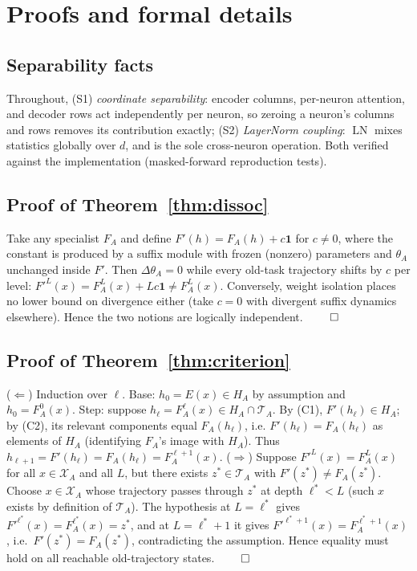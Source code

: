 \documentclass[11pt]{article}
\theoremstyle{definition}\newtheorem{definition}{Definition}
\theoremstyle{remark}\newtheorem{remark}{Remark}
\newcommand{\Xa}{\mathcal{X}_A}
\newcommand{\TA}{\mathcal{T}_A}
\begin{document}
\appendix

\section{Proofs and formal details}\label{app:proofs}

\subsection{Separability facts}
Throughout, (S1) \emph{coordinate separability}: encoder columns, per-neuron attention, and
decoder rows act independently per neuron, so zeroing a neuron's columns and rows removes
its contribution exactly; (S2) \emph{LayerNorm coupling}: $\operatorname{LN}$ mixes
statistics globally over $d$, and is the sole cross-neuron operation. Both verified against
the implementation (masked-forward reproduction tests).

\subsection{Proof of Theorem~\ref{thm:dissoc}}
Take any specialist $F_A$ and define $F'(h)=F_A(h)+c\mathbf{1}$ for $c\neq0$, where the
constant is produced by a suffix module with frozen (nonzero) parameters and $\theta_A$
unchanged inside $F'$. Then $\Delta\theta_A=0$ while every old-task trajectory shifts by
$c$ per level: $F'^L(x)=F_A^L(x)+Lc\mathbf{1}\neq F_A^L(x)$. Conversely, weight isolation
places no lower bound on divergence either (take $c=0$ with divergent suffix dynamics
elsewhere). Hence the two notions are logically independent. \hfill$\qed$

\subsection{Proof of Theorem~\ref{thm:criterion}}
($\Leftarrow$) Induction over $\ell$. Base: $h_0=E(x)\in H_A$ by assumption and
$h_0=F_A^0(x)$. Step: suppose $h_\ell=F_A^\ell(x)\in H_A\cap\TA$. By (C1),
$F'(h_\ell)\in H_A$; by (C2), its relevant components equal $F_A(h_\ell)$, i.e.
$F'(h_\ell)=F_A(h_\ell)$ as elements of $H_A$ (identifying $F_A$'s image with $H_A$).
Thus $h_{\ell+1}=F'(h_\ell)=F_A(h_\ell)=F_A^{\ell+1}(x)$.
($\Rightarrow$) Suppose $F'^L(x)=F_A^L(x)$ for all $x\in\Xa$ and all $L$, but there exists
$z^*\in\TA$ with $F'(z^*)\neq F_A(z^*)$. Choose $x\in\Xa$ whose trajectory passes through
$z^*$ at depth $\ell^*<L$ (such $x$ exists by definition of $\TA$). The hypothesis at
$L=\ell^*$ gives $F'^{\ell^*}(x)=F_A^{\ell^*}(x)=z^*$, and at $L=\ell^*+1$ it gives
$F'^{\ell^*+1}(x)=F_A^{\ell^*+1}(x)$, i.e.\ $F'(z^*)=F_A(z^*)$, contradicting the assumption. Hence equality must
hold on all reachable old-trajectory states. \hfill$\qed$
\end{document}
